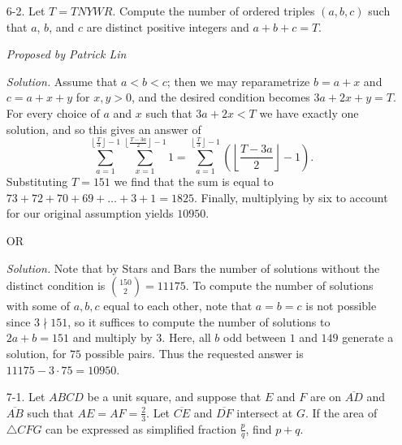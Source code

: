 \documentclass[10pt]{article}
\newcommand{\proposed}[1]
{
\vspace{5pt}
\noindent\textit{Proposed by #1}
}
\newcommand{\solution}
{
\vspace{5pt}
\noindent\textit{Solution.}\qquad
}
\begin{document}
\begin{enumerate}
\proposed{Patrick Lin}

\solution
Observe that $f$ has a real root if and only if the discriminant is non-negative, which rearranges to the condition $r\cdot a \ge 4b$. Casing on the value of $r$, we obtain that the probability is \[\frac{1}{6}\left(\frac{1}{8}+\frac{2}{8}+\frac{3}{8}+\frac{4}{8}+\frac{6}{10}+\frac{8}{12}\right) = \frac{151}{360},\] and so the desired answer is $\boxed{151}$.


\item[6-2.] Let $T = TNYWR$. Compute the number of ordered triples $(a,b,c)$ such that $a$, $b$, and $c$ are distinct positive integers and $a + b + c = T$.

\proposed{Patrick Lin}

\solution Assume that $a < b < c$; then we may reparametrize $b = a + x$ and $c = a + x + y$ for $x, y > 0$, and the desired condition becomes $3a + 2x + y = T$. For every choice of $a$ and $x$ such that $3a + 2x < T$ we have exactly one solution, and so this gives an answer of
\[\sum_{a=1}^{\left\lfloor\frac{T}{3}\right\rfloor - 1} \sum_{x=1}^{\left\lfloor\frac{T - 3a}{2}\right\rfloor - 1} 1 = \sum_{a=1}^{\left\lfloor\frac{T}{3}\right\rfloor - 1} \left(\left\lfloor\frac{T - 3a}{2}\right\rfloor - 1\right).\]
Substituting $T = 151$ we find that the sum is equal to $73 + 72 + 70 + 69 + \dots + 3 + 1 = 1825$. Finally, multiplying by six to account for our original assumption yields $\boxed{10950}$.

\begin{center}OR\end{center}

\solution Note that by Stars and Bars the number of solutions without the distinct condition is $\binom{150}2 = 11175$.  To compute the number of solutions with some of $a,b,c$ equal to each other, note that $a=b=c$ is not possible since $3\nmid 151$, so it suffices to compute the number of solutions to $2a+b=151$ and multiply by $3$.  Here, all $b$ odd between $1$ and $149$ generate a solution, for $75$ possible pairs.  Thus the requested answer is $11175 - 3\cdot 75 = \boxed{10950}$.


\item[7-1.] Let $ABCD$ be a unit square, and suppose that $E$ and $F$ are on $\overline{AD}$ and $\overline{AB}$ such that $AE = AF = \tfrac23$. Let $\overline{CE}$ and $\overline{DF}$ intersect at $G$. If the area of $\triangle CFG$ can be expressed as simplified fraction $\frac{p}{q}$, find $p + q$.


\end{enumerate}
\end{document}
